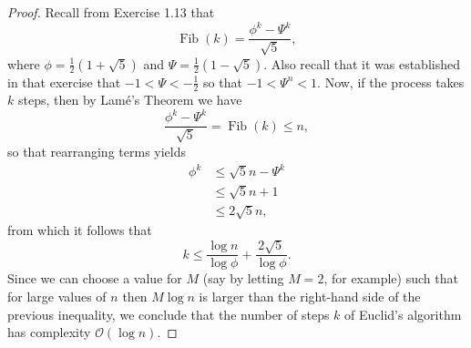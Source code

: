 \documentclass{article}
\DeclareMathOperator{\fib}{Fib}
\begin{document}
\begin{proof}
  Recall from Exercise 1.13 that
  \begin{equation*}
    \fib(k) = \frac{\phi^k - \Psi^k}{\sqrt{5}},
  \end{equation*}
  where $\phi = \frac{1}{2}(1 + \sqrt{5})$ and
  $\Psi = \frac{1}{2}(1 - \sqrt{5})$.  Also recall that it was established in
  that exercise that $-1 < \Psi < -\frac{1}{2}$ so that $-1 < \Psi^n < 1$.  Now,
  if the process takes $k$ steps, then by Lam\'e's Theorem we have
  \begin{equation*}
    \frac{\phi^k - \Psi^k}{\sqrt{5}} = \fib(k) \leq n,
  \end{equation*}
  so that rearranging terms yields
  \begin{align*}
    \phi^k &\leq \sqrt{5} n - \Psi^k \\
           &\leq \sqrt{5} n + 1 \\
           &\leq 2\sqrt{5} n,
  \end{align*}
  from which it follows that
  \begin{equation*}
    k \leq \frac{ \log n }{ \log\phi } + \frac{ 2\sqrt{5} }{ \log\phi }.
  \end{equation*}
  Since we can choose a value for $M$ (say by letting $M = 2$, for example) such
  that for large values of $n$ then $M \log n$ is larger than the right-hand
  side of the previous inequality, we conclude that the number of steps $k$ of
  Euclid's algorithm has complexity $\mathcal{O}(\log n)$.
\end{proof}
\end{document}
